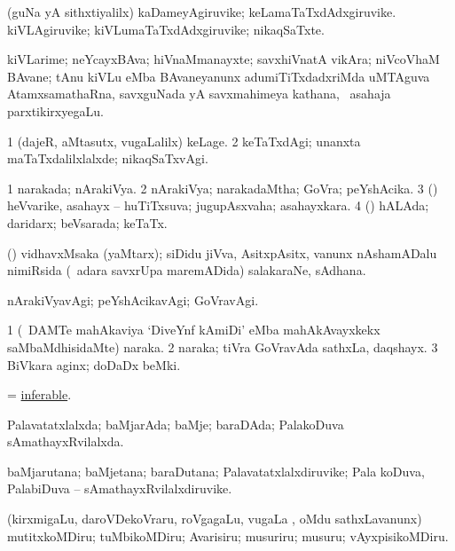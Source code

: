 \bentry
{}
\gl{\nA}
\bmng
(guNa yA sithxtiyalilx) 
\banum
{} kaDameyAgiruvike; keLamaTaTxdAdxgiruvike. 
 kiVLAgiruvike; kiVLumaTaTxdAdxgiruvike; nikaqSaTxte. 
\eanum
\emng
\eentry

\bentry
{}
\gl{\nA}
\bmng
kiVLarime; neYcayxBAva; hiVnaMmanayxte; savxhiVnatA vikAra; niVcoVhaM BAvane; tAnu kiVLu eMba BAvaneyanunx adumiTiTxdadxriMda uMTAguva AtamxsamathaRna, savxguNada yA savxmahimeya kathana, \mo\ asahaja parxtikirxyegaLu. 
\emng
\eentry

\bentry
{}
\gl{\kirxvi}
\bmng
\bnum
\num{1} (dajeR, aMtasutx, \mo vugaLalilx) keLage. 
\num{2} keTaTxdAgi; unanxta maTaTxdalilxlalxde; nikaqSaTxvAgi. 
\enum
\emng
\eentry

\bentry
{}
\gl{\gu}
\bmng
\bnum
\num{1} narakada; nArakiVya. 
\num{2} nArakiVya; narakadaMtha; GoVra; peYshAcika. 
\num{3} (\AmA) heVvarike, asahayx -- huTiTxsuva; jugupAsxvaha; asahayxkara. 
\num{4} (\AmA) hALAda; daridarx; beVsarada; keTaTx. 
\enum
\emng

\noindent
\gl{\pagu}
\bmng
{} (\pArxparx) vidhavxMsaka (yaMtarx); siDidu jiVva, AsitxpAsitx, \mo vanunx nAshamADalu nimiRsida (\sA\ adara savxrUpa maremADida) salakaraNe, sAdhana. 
\emng
\eentry

\bentry
{}
\gl{\kirxvi}
\bmng
nArakiVyavAgi; peYshAcikavAgi; GoVravAgi. 
\emng
\eentry

\bentry
{}
\gl{\nA}
\bmng
\bnum
\num{1} (\kanmu\ DAMTe mahAkaviya `DiveYnf kAmiDi' eMba mahAkAvayxkekx saMbaMdhisidaMte) naraka. 
\num{2} naraka; tiVra GoVravAda sathxLa, daqshayx. 
\num{3} BiVkara aginx; doDaDx beMki. 
\enum
\emng
\eentry

\bentry
{}
\gl{\gu}
\bmng
 = \hyperlink{inferable}{inferable}. 
\emng
\eentry

\bentry
{}
\gl{\gu}
\bmng
Palavatatxlalxda; baMjarAda; baMje; baraDAda; PalakoDuva sAmathayxRvilalxda. 
\emng
\eentry

\bentry
{}
\gl{\nA}
\bmng
baMjarutana; baMjetana; baraDutana; Palavatatxlalxdiruvike; Pala koDuva, PalabiDuva -- sAmathayxRvilalxdiruvike. 
\emng
\eentry

\bentry
{}
\gl{\sakirx}
\bmng
(kirxmigaLu, daroVDekoVraru, roVgagaLu, \mo vugaLa \vi, oMdu sathxLavanunx) mutitxkoMDiru; tuMbikoMDiru; Avarisiru; musuriru; musuru; vAyxpisikoMDiru. 
\emng
\eentry

